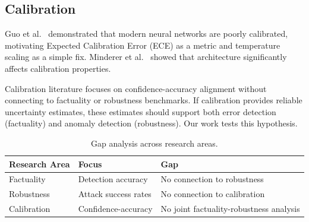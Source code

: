 \subsection{Calibration}

Guo et al.\ \cite{guo2017calibration} demonstrated that modern neural networks are poorly calibrated, motivating Expected Calibration Error (ECE) as a metric and temperature scaling as a simple fix. Minderer et al.\ \cite{minderer2021revisiting} showed that architecture significantly affects calibration properties.

Calibration literature focuses on confidence-accuracy alignment without connecting to factuality or robustness benchmarks. If calibration provides reliable uncertainty estimates, these estimates should support both error detection (factuality) and anomaly detection (robustness). Our work tests this hypothesis.

\begin{table}[h]
\centering
\caption{Gap analysis across research areas.}
\label{tab:gap}
\begin{tabular}{lll}
\toprule
Research Area & Focus & Gap \\
\midrule
Factuality & Detection accuracy & No connection to robustness \\
Robustness & Attack success rates & No connection to calibration \\
Calibration & Confidence-accuracy & No joint factuality-robustness analysis \\
\bottomrule
\end{tabular}
\end{table}
